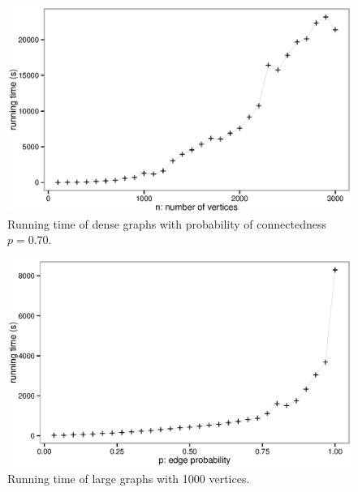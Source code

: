 \documentclass{article}
\begin{document}
\begin{figure}[!htb]
\label{fig:dense}
{\centering \includegraphics[width=1\textwidth]{dense} 
\caption{Running time of dense graphs with probability of connectedness $p=0.70$.}
}
\end{figure}





\begin{figure}[!htb]
\label{fig:large}
{\centering \includegraphics[width=1\textwidth]{large} 
\caption{Running time of large graphs with 1000 vertices.}
}
\end{figure}
\end{document}
